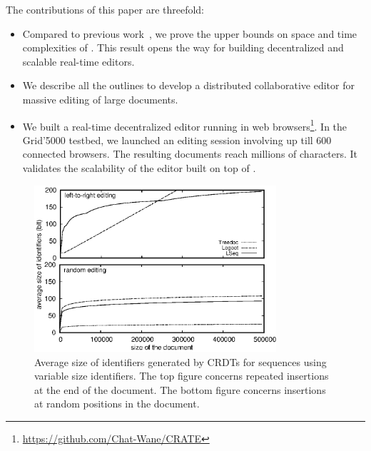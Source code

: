 The contributions of this paper are threefold:
\begin{itemize}
\item Compared to previous work~\cite{nedelec2013concurrency, nedelec2013lseq},
  we prove the upper bounds on space and time complexities of \LSEQ. This result
  opens the way for building decentralized and scalable real-time editors.
\item We describe all the outlines to develop a distributed
  collaborative editor for massive editing of large documents.
\item We built a real-time decentralized editor running in web
  browsers\footnote{\url{https://github.com/Chat-Wane/CRATE}}. In the Grid'5000
  testbed, we launched an editing session involving up till 600 connected
  browsers. The resulting documents reach millions of characters. It validates
  the scalability of the editor built on top of \LSEQ.
\end{itemize}

\begin{figure}
  \centering
  \includegraphics[width=0.8\textwidth]{img/complexity.eps}
  \caption{\label{fig:complexity} Average size of identifiers generated by CRDTs
    for sequences using variable size identifiers. The top figure concerns
    repeated insertions at the end of the document. The bottom figure concerns
    insertions at random positions in the document.}
\end{figure}

